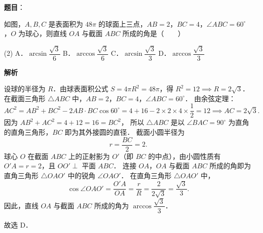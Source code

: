 \begin{answer}

\textbf{题目}：

如图，$A, B, C$ 是表面积为 $48\pi$ 的球面上三点，$AB = 2$，$BC = 4$，$\angle ABC = 60^\circ$，$O$ 为球心，则直线 $OA$ 与截面 $ABC$ 所成的角是\mbox{（　　）}

\begin{gkopts}(2)
\task A．$\arcsin\dfrac{\sqrt{3}}{6}$
\task B．$\arccos\dfrac{\sqrt{3}}{6}$
\task C．$\arcsin\dfrac{\sqrt{3}}{3}$
\task D．$\arccos\dfrac{\sqrt{3}}{3}$
\end{gkopts}
\nopagebreak[4]
\begin{center}\end{center}
\nopagebreak[4]
\textbf{解析}

设球的半径为 $R$．由球表面积公式 $S = 4\pi R^2 = 48\pi$，得 $R^2 = 12 \implies R = 2\sqrt{3}$．
在截面三角形 $\triangle ABC$ 中，$AB = 2$，$BC = 4$，$\angle ABC = 60^\circ$．
由余弦定理：
\nopagebreak[4]
\[
AC^2 = AB^2 + BC^2 - 2 AB \cdot BC \cos 60^\circ = 4 + 16 - 2 \times 2 \times 4 \times \frac{1}{2} = 12 \implies AC = 2\sqrt{3}.
\]
因为 $AB^2 + AC^2 = 4 + 12 = 16 = BC^2$，
所以 $\triangle ABC$ 是以 $\angle BAC = 90^\circ$ 为直角的直角三角形，$BC$ 即为其外接圆的直径．
截面小圆半径为
\nopagebreak[4]
\[
r = \frac{BC}{2} = 2.
\]
球心 $O$ 在截面 $ABC$ 上的正射影为 $O'$（即 $BC$ 的中点），由小圆性质有 $O'A = r = 2$，且 $OO' \perp$ 平面 $ABC$．
连接 $OA$，$OA$ 与截面 $ABC$ 所成的角即为直角三角形 $\triangle OA O'$ 中的锐角 $\angle OA O'$．
在直角三角形 $\triangle OA O'$ 中，
\nopagebreak[4]
\[
\cos \angle OA O' = \frac{O'A}{OA} = \frac{r}{R} = \frac{2}{2\sqrt{3}} = \frac{\sqrt{3}}{3}.
\]
因此，直线 $OA$ 与截面 $ABC$ 所成的角为 $\arccos\dfrac{\sqrt{3}}{3}$．
\nopagebreak[4]
\begin{center}\end{center}
\nopagebreak[4]
故选 D．


\end{answer}

